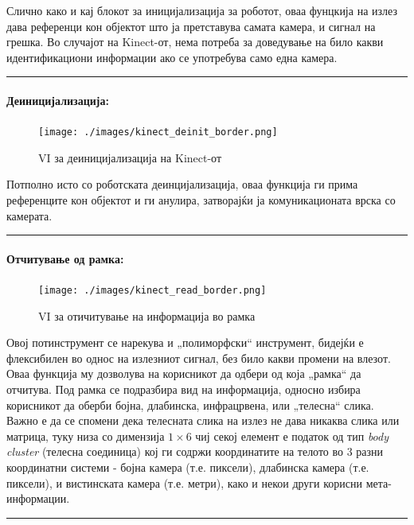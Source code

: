 \documentclass[11pt]{article}
\begin{document}
        Слично како и кај блокот за иницијализација за роботот, оваа фунцкија на излез дава референци кон објектот што ја претставува самата камера, и сигнал на грешка. Во случајот на Kinect-от, нема потреба за доведување на било какви идентификациони информации ако се употребува само една камера.\\
        \textcolor[RGB]{150,150,150}{\rule{\linewidth}{1.6pt}}

      \paragraph{Деиницијализација:\\}
	      \begin{figure}[H]
          \centering
	        \texttt{[image: ./images/kinect\_deinit\_border.png]}
	        \caption{VI за деиницијализација на Kinect-от}
	        \label{fig:kinect_deinit.png}
	        \end{figure}
        Потполно исто со роботската деинцијализација, оваа функција ги прима референците кон објектот и ги анулира, затворајќи ја комуникационата врска со камерата.\\
        \textcolor[RGB]{150,150,150}{\rule{\linewidth}{1.6pt}}

      \paragraph{Отчитување од рамка:\\}
	      \begin{figure}[H]
          \centering
	        \texttt{[image: ./images/kinect\_read\_border.png]}
	        \caption{VI за отичитување на информација во рамка}
	        \label{fig:kinect_read.png}
	        \end{figure}
        Овој потинструмент се нарекува и „полиморфски“ инструмент, бидејќи е флексибилен во однос на излезниот сигнал, без било какви промени на влезот. Оваа функција му дозволува на корисникот да одбери од која „рамка“ да отчитува. Под рамка се подразбира вид на информација, односно избира корисникот да оберби бојна, длабинска, инфрацрвена, или „телесна“ слика. Важно е да се спомени дека телесната слика на излез не дава никаква слика или матрица, туку низа со димензија $1 \times 6$ чиј секој елемент е податок од тип \textit{body cluster} (телесна соединица) кој ги содржи координатите на телото во 3 разни координатни системи - бојна камера (т.е. пиксели), длабинска камера (т.е. пиксели), и вистинската камера (т.е. метри), како и некои други корисни мета-информации.\\
        \textcolor[RGB]{150,150,150}{\rule{\linewidth}{1.6pt}}
\end{document}

